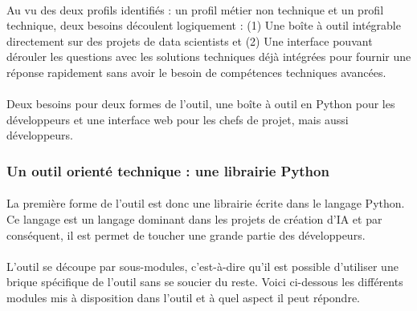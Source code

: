 \documentclass[10pt, french, a4paper]{report}
\begin{document}
\paragraph{}
Au vu des deux profils identifiés : un profil métier non technique et un profil technique, deux besoins découlent logiquement : (1) Une boîte à outil intégrable directement sur des projets de data scientists et (2) Une interface pouvant dérouler les questions avec les solutions techniques déjà intégrées pour fournir une réponse rapidement sans avoir le besoin de compétences techniques avancées.

\paragraph{}
Deux besoins pour deux formes de l'outil, une boîte à outil en Python pour les développeurs et une interface web pour les chefs de projet, mais aussi développeurs.

\subsubsection{Un outil orienté technique : une librairie Python}

\paragraph{}
La première forme de l'outil est donc une librairie écrite dans le langage Python. Ce langage est un langage dominant dans les projets de création d'IA et par conséquent, il est permet de toucher une grande partie des développeurs. 

\paragraph{}
L'outil se découpe par sous-modules, c'est-à-dire qu'il est possible d'utiliser une brique spécifique de l'outil sans se soucier du reste. Voici ci-dessous les différents modules mis à disposition dans l'outil et à quel aspect il peut répondre.
\end{document}

